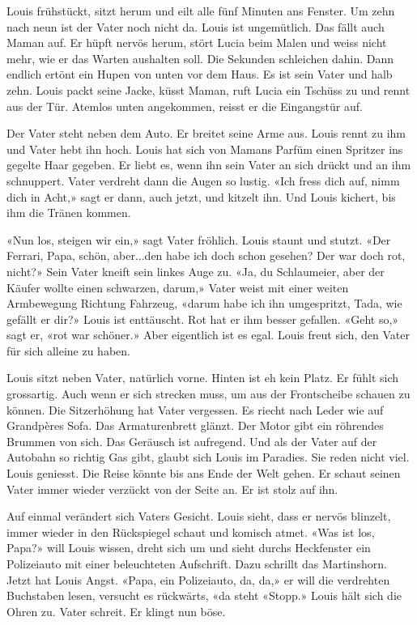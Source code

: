 Louis frühstückt, sitzt herum und eilt alle fünf Minuten ans Fenster. Um
zehn nach neun ist der Vater noch nicht da. Louis ist ungemütlich. Das
fällt auch Maman auf. Er hüpft nervös herum, stört Lucia beim Malen und
weiss nicht mehr, wie er das Warten aushalten soll. Die Sekunden
schleichen dahin. Dann endlich ertönt ein Hupen von unten vor dem Haus.
Es ist sein Vater und halb zehn. Louis packt seine Jacke, küsst Maman,
ruft Lucia ein Tschüss zu und rennt aus der Tür. Atemlos unten
angekommen, reisst er die Eingangstür auf.

Der Vater steht neben dem Auto. Er breitet seine Arme aus. Louis rennt
zu ihm und Vater hebt ihn hoch. Louis hat sich von Mamans Parfüm einen
Spritzer ins gegelte Haar gegeben. Er liebt es, wenn ihn sein Vater an
sich drückt und an ihm schnuppert. Vater verdreht dann die Augen so
lustig. «Ich fress dich auf, nimm dich in Acht,» sagt er dann, auch
jetzt, und kitzelt ihn. Und Louis kichert, bis ihm die Tränen kommen.

«Nun los, steigen wir ein,» sagt Vater fröhlich. Louis staunt und
stutzt. «Der Ferrari, Papa, schön, aber...den habe ich doch schon
gesehen? Der war doch rot, nicht?» Sein Vater kneift sein linkes Auge
zu. «Ja, du Schlaumeier, aber der Käufer wollte einen schwarzen, darum,»
Vater weist mit einer weiten Armbewegung Richtung Fahrzeug, «darum habe
ich ihn umgespritzt, Tada, wie gefällt er dir?» Louis ist enttäuscht.
Rot hat er ihm besser gefallen. «Geht so,» sagt er, «rot war schöner.»
Aber eigentlich ist es egal. Louis freut sich, den Vater für sich
alleine zu haben.

Louis sitzt neben Vater, natürlich vorne. Hinten ist eh kein Platz. Er
fühlt sich grossartig. Auch wenn er sich strecken muss, um aus der
Frontscheibe schauen zu können. Die Sitzerhöhung hat Vater vergessen. Es
riecht nach Leder wie auf Grandpères Sofa. Das Armaturenbrett glänzt.
Der Motor gibt ein röhrendes Brummen von sich. Das Geräusch ist
aufregend. Und als der Vater auf der Autobahn so richtig Gas gibt,
glaubt sich Louis im Paradies. Sie reden nicht viel. Louis geniesst. Die
Reise könnte bis ans Ende der Welt gehen. Er schaut seinen Vater immer
wieder verzückt von der Seite an. Er ist stolz auf ihn.

Auf einmal verändert sich Vaters Gesicht. Louis sieht, dass er nervös
blinzelt, immer wieder in den Rückspiegel schaut und komisch atmet. «Was
ist los, Papa?» will Louis wissen, dreht sich um und sieht durchs
Heckfenster ein Polizeiauto mit einer beleuchteten Aufschrift. Dazu
schrillt das Martinshorn. Jetzt hat Louis Angst. «Papa, ein Polizeiauto,
da, da,» er will die verdrehten Buchstaben lesen, versucht es rückwärts,
«da steht «Stopp.» Louis hält sich die Ohren zu. Vater schreit. Er
klingt nun böse.

